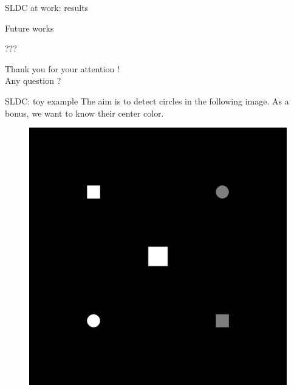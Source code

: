 \documentclass{beamer}
\begin{document}
\begin{frame}{SLDC at work: results }
\end{frame}
\begin{frame}{Future works}

???

\end{frame}


\begin{frame}
	\vfill
	\begin{center}
		Thank you for your attention ! \\
		Any question ?
	\end{center}
	\vfill
\end{frame}


\begin{frame}{SLDC: toy example}
	The aim is to detect circles in the following image. As a bonus, we want to know their center color.
	\vfill
	\begin{figure}
		\includegraphics[scale=0.04]{images/toy_example.png}
	\end{figure}
	\vfill
\end{frame}
\end{document}

